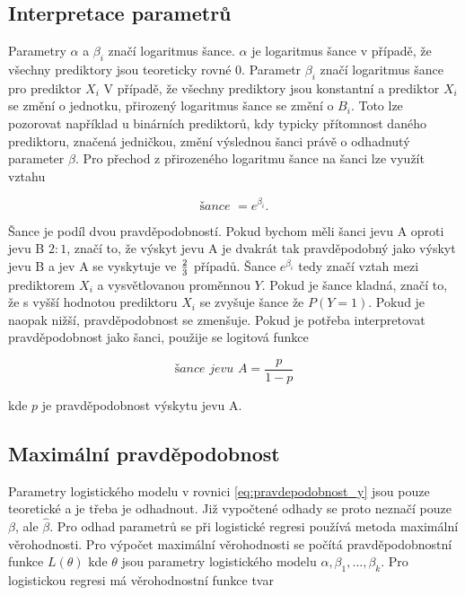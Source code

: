 \subsection{Interpretace parametrů}
Parametry $\alpha$ a $\beta_i$ značí logaritmus šance. $\alpha$ je logaritmus šance v případě, že všechny prediktory
jsou teoreticky rovné $0$. Parametr $\beta_i$ značí logaritmus šance pro prediktor $X_i$
{\color{red}
V případě, že všechny prediktory jsou konstantní a prediktor $X_i$ se změní o jednotku, přirozený logaritmus
šance se změní o $B_i$. Toto lze pozorovat například u binárních prediktorů, kdy typicky přítomnost
daného prediktoru, značená jedničkou, změní výslednou šanci právě o odhadnutý parameter $\beta$.
Pro přechod z přirozeného logaritmu šance na šanci lze využít vztahu
}

\begin{equation}
\textit{šance } = e^{\beta_i}.
\end{equation}

Šance je podíl dvou pravděpodobností. Pokud bychom měli šanci jevu A oproti jevu B $2 : 1$, značí to, že výskyt jevu A je dvakrát tak pravděpodobný
jako výskyt jevu B a jev A se vyskytuje ve $2 \over 3$ případů. Šance $e^{\beta_i}$ tedy značí vztah mezi prediktorem $X_i$ a vysvětlovanou proměnnou $Y$. Pokud je
šance kladná, značí to, že s vyšší hodnotou prediktoru $X_i$ se zvyšuje šance že $P(Y = 1)$. Pokud je naopak nižší, pravděpodobnost se zmenšuje. Pokud je potřeba
interpretovat pravděpodobnost jako šanci, použije se logitová funkce

\begin{equation}
    \label{eq:logitova_funkce}
    \textit{šance jevu A} = \frac{p}{1 - p}
\end{equation}

kde $p$ je pravděpodobnost výskytu jevu A.

\subsection{Maximální pravděpodobnost}
Parametry logistického modelu v rovnici \ref{eq:pravdepodobnost_y} jsou pouze teoretické a je třeba je odhadnout. Již vypočtené odhady
se proto neznačí pouze $\beta$, ale $\hat{\beta}$. Pro odhad parametrů se při logistické regresi používá metoda maximální věrohodnosti. Pro výpočet
maximální věrohodnosti se počítá pravděpodobnostní funkce $L(\theta)$ kde $\theta$ jsou parametry logistického modelu $\alpha, \beta_1, ..., \beta_k$.
Pro logistickou regresi má věrohodnostní funkce tvar

